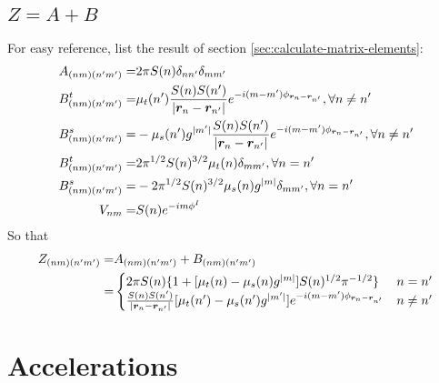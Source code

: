 \documentclass [10pt,letterpaper]{article}
\renewcommand{\vec}{\vectorsym}
\begin{document}
\subsection{$Z=A+B$}
\label{sub:Z-A-B}
For easy reference, list the result of section \ref{sec:calculate-matrix-elements}:
\begin{align} \label{eq:list-of-Z-A-B}
	A_{(n m)(n^\prime m^\prime)}
	=&
	2\pi S(n)
	\delta_{n n^\prime}
	\delta_{m m^\prime}
	\\
	B^t_{(n m)(n^\prime m^\prime)}
	=& 
	\mu_t(n^\prime) 
	\frac{S(n) S(n^\prime)}{\lvert\vec{r}_n-\vec{r}_{n^\prime}\rvert}
	e^{-i (m-m^\prime) \phi_{\vec{r}_n-\vec{r}_{n^\prime}}}
	,
	\forall n\neq n^\prime
	\\
	B^s_{(n m)(n^\prime m^\prime)}
	=&
	-
	\mu_s(n^\prime)g^{\lvert m^\prime \rvert} 
	\frac{S(n) S(n^\prime)}{\lvert\vec{r}_n-\vec{r}_{n^\prime}\rvert}
	e^{-i (m-m^\prime) \phi_{\vec{r}_n-\vec{r}_{n^\prime}}}
	,
	\forall n\neq n^\prime
	\\
	B^t_{(n m)(n^\prime m^\prime)}
	=&
	2 
	\pi^{1/2}
	S(n)^{3/2}
	\mu_t(n) 
	\delta_{m m^\prime}
	,
	\forall n = n^\prime
	\\
	B^s_{(n m)(n^\prime m^\prime)}
	=&
	-2 
	\pi^{1/2}
	S(n)^{3/2}
	\mu_s(n)g^{\lvert m\rvert} 
	\delta_{m m^\prime}
	,
	\forall n = n^\prime
	\\
	V_{n m}
	=&
	S(n)e^{-i m \phi^I}
\end{align}
So that
\begin{equation} \label{eq:result-Znmnpmp-1pt}
	\begin{split}
		Z_{(n m)(n^\prime m^\prime)}
		=&
		A_{(n m)(n^\prime m^\prime)}
		+
		B_{(n m)(n^\prime m^\prime)}
		\\
		=& 
		\begin{cases}
			2\pi S(n) 
			\{
			1+[ \mu_t(n) -\mu_s(n) g^{\lvert m \rvert} ] 
			S(n)^{1/2}\pi^{-1/2}
			\}
			&
			n=n^\prime
			\\
			\frac{S(n)S(n^\prime)}{\lvert \vec{r}_n-\vec{r}_{n^\prime} \rvert}
			[ \mu_t(n^\prime)-\mu_s(n^\prime) g^{\lvert m^\prime \rvert} ]
			e^{-i(m-m^\prime)\phi_{\vec{r}_n-\vec{r}_{n^\prime}}}
			&
			n \neq n^\prime
		\end{cases}
	\end{split}
\end{equation}



\section{Accelerations}
\label{sec:acceleration}
	
\end{document}
